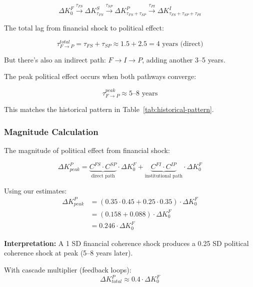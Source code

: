 \begin{equation}
\Delta K^F_0 \xrightarrow{\tau_{FS}} \Delta K^S_{\tau_{FS}} \xrightarrow{\tau_{SP}} \Delta K^P_{\tau_{FS}+\tau_{SP}} \xrightarrow{\tau_{PI}} \Delta K^I_{\tau_{FS}+\tau_{SP}+\tau_{PI}}
\end{equation}

The total lag from financial shock to political effect:

\begin{equation}
\tau_{F \to P}^{total} = \tau_{FS} + \tau_{SP} \approx 1.5 + 2.5 = 4 \text{ years (direct)}
\end{equation}

But there's also an indirect path: $F \to I \to P$, adding another 3--5 years.

The peak political effect occurs when both pathways converge:

\begin{equation}
\tau_{F \to P}^{peak} \approx 5\text{--}8 \text{ years}
\end{equation}

This matches the historical pattern in Table~\ref{tab:historical-pattern}.

\subsubsection{Magnitude Calculation}

The magnitude of political effect from financial shock:

\begin{equation}
\Delta K^P_{peak} = \underbrace{C^{FS} \cdot C^{SP}}_{\text{direct path}} \cdot \Delta K^F_0 + \underbrace{C^{FI} \cdot C^{IP}}_{\text{institutional path}} \cdot \Delta K^F_0
\end{equation}

Using our estimates:
\begin{align}
\Delta K^P_{peak} &= (0.35 \cdot 0.45 + 0.25 \cdot 0.35) \cdot \Delta K^F_0 \nonumber \\
&= (0.158 + 0.088) \cdot \Delta K^F_0 \nonumber \\
&= 0.246 \cdot \Delta K^F_0
\end{align}

\textbf{Interpretation:} A 1 SD financial coherence shock produces a 0.25 SD 
political coherence shock at peak (5--8 years later).

With cascade multiplier (feedback loops):
\begin{equation}
\Delta K^P_{total} \approx 0.4 \cdot \Delta K^F_0
\end{equation}

